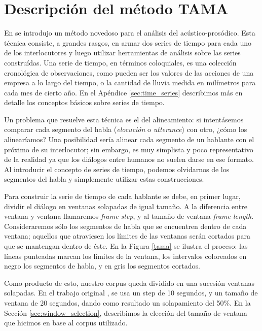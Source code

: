 \section{Descripción del método TAMA}
\label{sec:ant_tama}

En \cite{KOU2008} se introdujo un método novedoso para el análisis del \entrainment acústico-prosódico. Esta técnica consiste, a grandes rasgos, en armar dos series de tiempo para cada uno de los interlocutores y luego utilizar herramientas de análisis sobre las series construídas. Una serie de tiempo, en términos coloquiales, es una colección cronológica de observaciones, como pueden ser los valores de las acciones de una empresa a lo largo del tiempo, o la cantidad de lluvia medida en milímetros para cada mes de cierto año. En el Apéndice \ref{sec:time_series} describimos más en detalle los conceptos básicos sobre series de tiempo.

Un problema que resuelve esta técnica es el del alineamiento: si intentásemos comparar cada segmento del habla (\emph{elocución} o \emph{utterance}) con otro, ¿cómo los alinearíamos? Una posibilidad sería alinear cada segmento de un hablante con el próximo de su interlocutor; sin embargo, es muy simplista y poco representativo de la realidad ya que los diálogos entre humanos no suelen darse en ese formato. Al introducir el concepto de series de tiempo, podemos olvidarnos de los segmentos del habla y simplemente utilizar estas construcciones.

Para construir la serie de tiempo de cada hablante se debe, en primer lugar, dividir el diálogo en ventanas solapadas de igual tamaño. A la diferencia entre ventana y ventana llamaremos \emph{frame step}, y al tamaño de ventana \emph{frame length}. Consideraremos sólo los segmentos de habla que se encuentren dentro de cada ventana; aquellos que atraviesen los límites de las ventanas serán cortados para que se mantengan dentro de éste. En la Figura \ref{tama} se ilustra el proceso: las líneas punteadas marcan los límites de la ventana, los intervalos coloreados en negro los segmentos de habla, y en gris los segmentos cortados.

Como producto de esto, nuestro corpus queda dividido en una sucesión ventanas solapadas. En el trabajo original \cite{KOU2008}, se usa un step de 10 segundos, y un tamaño de ventana de 20 segundos, dando como resultado un solapamiento del 50\%. En la Sección \ref{sec:window_selection}, describimos la elección del tamaño de ventana que hicimos en base al corpus utilizado.

